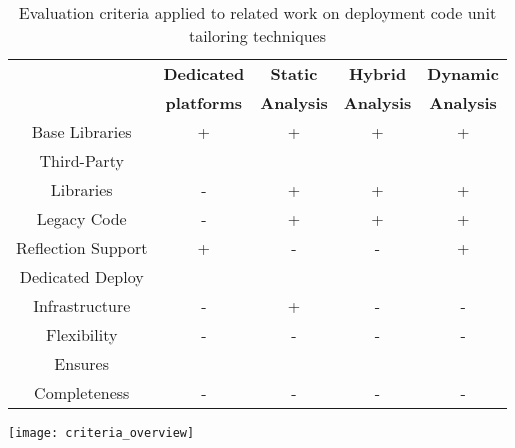 \begin{table}[ht]
 \small
 	\centering
 	\begin{tabular}{|c|cccc|}
	
\hline
 			& \textbf{Dedicated}
 			& \textbf{Static}
			& \textbf{Hybrid}
 			& \textbf{Dynamic} \\
 			& \textbf{platforms}
 			& \textbf{Analysis}
			& \textbf{Analysis}
 			& \textbf{Analysis}\\
  \cmidrule(r){2-5}

		Base Libraries
 			& + & + & + & +\\
		\hline
		Third-Party
		& & & & \\Libraries
 			& - & + & + & +\\
		\hline
		Legacy Code
 			& - & + & + & + \\
		\hline
		Reflection Support
 			& + & - & - & + \\
		\hline
		Dedicated Deploy
			& & & & \\
		Infrastructure
 			& - & + & - & -  \\
		\hline
		Flexibility
 			& - & - & - & -   \\
		\hline
		Ensures
		& & & & \\
		Completeness
 			& - & - & - & - \\
 	 \hline
 	\end{tabular}
	\texttt{[image: criteria\_overview]}
 	\caption{Evaluation criteria applied to related work on deployment code unit tailoring techniques}
 	\label{tb:comparison_intro}
 \end{table}

